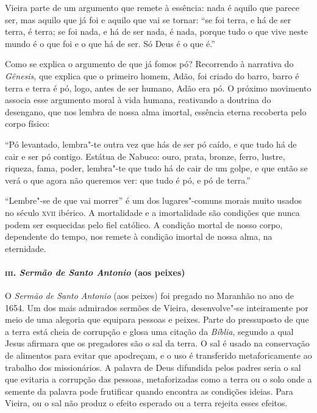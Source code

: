 Vieira parte de um argumento que remete à essência: nada é aquilo que
parece ser, mas aquilo que já foi e aquilo que vai se tornar: ``se foi
terra, e há de ser terra, é terra; se foi nada, e há de ser nada, é
nada, porque tudo o que vive neste mundo é o que foi e o que há de ser.
Só Deus é o que é.''

Como se explica o argumento de que já fomos pó? Recorrendo à narrativa
do \emph{Gênesis}, que explica que o primeiro homem, Adão, foi criado do
barro, barro é terra e terra é pó, logo, antes de ser humano, Adão era
pó. O próximo movimento associa esse argumento moral à vida humana,
reativando a doutrina do desengano, que nos lembra de nossa alma
imortal, essência eterna recoberta pelo corpo físico:

``Pó levantado, lembra"-te outra vez que hás de ser pó caído, e que tudo
há de cair e ser pó contigo. Estátua de Nabuco: ouro, prata, bronze,
ferro, lustre, riqueza, fama, poder, lembra"-te que tudo há de cair de um
golpe, e que então se verá o que agora não queremos ver: que tudo é pó,
e pó de terra.''

``Lembre"-se de que vai morrer'' é um dos lugares"-comuns morais muito
usados no século \textsc{xvii} ibérico. A mortalidade e a imortalidade são
condições que nunca podem ser esquecidas pelo fiel católico. A condição
mortal de nosso corpo, dependente do tempo, nos remete à condição
imortal de nossa alma, na eternidade.

\paragraph{\textsc{iii}. \emph{Sermão de Santo Antonio} (aos peixes)}

O \emph{Sermão de Santo Antonio} (aos peixes) foi pregado no Maranhão no
ano de 1654. Um dos mais admirados sermões de Vieira, desenvolve"-se
inteiramente por meio de uma alegoria que equipara pessoas e peixes.
Parte do pressuposto de que a terra está cheia de corrupção e glosa uma
citação da \emph{Bíblia}, segundo a qual Jesus afirmara que os
pregadores são o sal da terra. O sal é usado na conservação de alimentos
para evitar que apodreçam, e o uso é transferido metaforicamente ao
trabalho dos missionários. A palavra de Deus difundida pelos padres
seria o sal que evitaria a corrupção das pessoas, metaforizadas como a
terra ou o solo onde a semente da palavra pode frutificar quando
encontra as condições ideias. Para Vieira, ou o sal não produz o efeito
esperado ou a terra rejeita esses efeitos.

